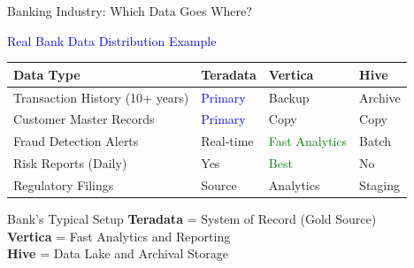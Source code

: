\documentclass{beamer}
\begin{document}
	
	\begin{frame}{Banking Industry: Which Data Goes Where?}
		\begin{center}
			\textcolor{blue}{\Large Real Bank Data Distribution Example}
		\end{center}
		
		\begin{table}
			\small
			\begin{tabular}{|p{}|p{0.23\textwidth}|p{}|p{}|}
				\hline
				\textbf{Data Type} & \textbf{Teradata} & \textbf{Vertica} & \textbf{Hive} \\
				\hline
				Transaction History (10+ years) & \textcolor{blue}{Primary} & Backup & Archive \\
				\hline
				Customer Master Records & \textcolor{blue}{Primary} & Copy & Copy \\
				\hline
				Fraud Detection Alerts & Real-time & \textcolor{green}{Fast Analytics} & Batch \\
				\hline
				Risk Reports (Daily) & Yes & \textcolor{green}{Best} & No \\
				\hline
				Regulatory Filings & Source & Analytics & Staging \\
				\hline
			\end{tabular}
		\end{table}
		
		\begin{alertblock}{Bank's Typical Setup}
			\textbf{Teradata} = System of Record (Gold Source) \\
			\textbf{Vertica} = Fast Analytics and Reporting \\
			\textbf{Hive} = Data Lake and Archival Storage
		\end{alertblock}
	\end{frame}
	
\end{document}
